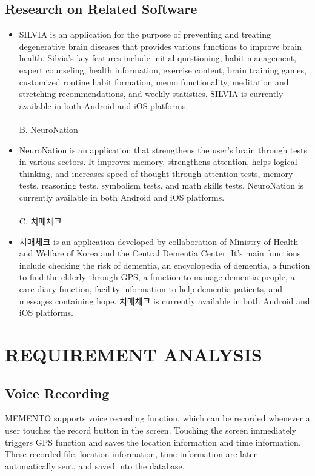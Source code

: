 \documentclass[conference]{IEEEtran}
\begin{document}
\subsection{Research on Related Software}\label{SCM}
\begin{itemize}
A. SILVIA\\
\item SILVIA is an application for the purpose of preventing and treating degenerative brain diseases that provides various functions to improve brain health. Silvia's key features include initial questioning, habit management, expert counseling, health information, exercise content, brain training games, customized routine habit formation, memo functionality, meditation and stretching recommendations, and weekly statistics. SILVIA is currently available in both Android and iOS platforms.\\
\\
B. NeuroNation\\
\item NeuroNation is an application that strengthens the user's brain through tests in various sectors. It improves memory, strengthens attention, helps logical thinking, and increases speed of thought through attention tests, memory tests, reasoning tests, symbolism tests, and math skills tests. NeuroNation is currently available in both Android and iOS platforms.\\
\\
C. 치매체크\\
\item 치매체크 is an application developed by collaboration of Ministry of Health and Welfare of Korea and the Central Dementia Center. It’s main functions include checking the risk of dementia, an encyclopedia of dementia, a function to find the elderly through GPS, a function to manage dementia people, a care diary function, facility information to help dementia patients, and messages containing hope. 치매체크 is currently available in both Android and iOS platforms.\\
\end{itemize}

\section{REQUIREMENT ANALYSIS}
\subsection{Voice Recording}
MEMENTO supports voice recording function, which can be recorded whenever a user touches the record button in the screen. Touching the screen immediately triggers GPS function and saves the location information and time information. These recorded file, location information, time information are later automatically sent, and saved into the database.\\
\end{document}
